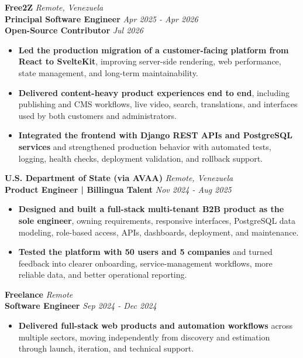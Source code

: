\documentclass[10pt]{article}
\begin{document}
\vspace{2pt}
\textbf{Free2Z} \hfill \textit{Remote, Venezuela} \\
\textbf{Principal Software Engineer} \hfill \textit{Apr 2025 - Apr 2026} \\
\textbf{Open-Source Contributor} \hfill \textit{Jul 2026}
\begin{itemize}
    \item \textbf{Led the production migration of a customer-facing platform from React to SvelteKit}, improving server-side rendering, web performance, state management, and long-term maintainability.
    \item \textbf{Delivered content-heavy product experiences end to end}, including publishing and CMS workflows, live video, search, translations, and interfaces used by both customers and administrators.
    \item \textbf{Integrated the frontend with Django REST APIs and PostgreSQL services} and strengthened production behavior with automated tests, logging, health checks, deployment validation, and rollback support.
\end{itemize}

\vspace{2pt}
\textbf{U.S. Department of State (via AVAA)} \hfill \textit{Remote, Venezuela} \\
\textbf{Product Engineer | Billingua Talent} \hfill \textit{Nov 2024 - Aug 2025}
\begin{itemize}
    \item \textbf{Designed and built a full-stack multi-tenant B2B product as the sole engineer}, owning requirements, responsive interfaces, PostgreSQL data modeling, role-based access, APIs, dashboards, deployment, and maintenance.
    \item \textbf{Tested the platform with 50 users and 5 companies} and turned feedback into clearer onboarding, service-management workflows, more reliable data, and better operational reporting.
\end{itemize}

\vspace{2pt}
\textbf{Freelance} \hfill \textit{Remote} \\
\textbf{Software Engineer} \hfill \textit{Sep 2024 - Dec 2024}
\begin{itemize}
    \item \textbf{Delivered full-stack web products and automation workflows} across multiple sectors, moving independently from discovery and estimation through launch, iteration, and technical support.
\end{itemize}
\end{document}
